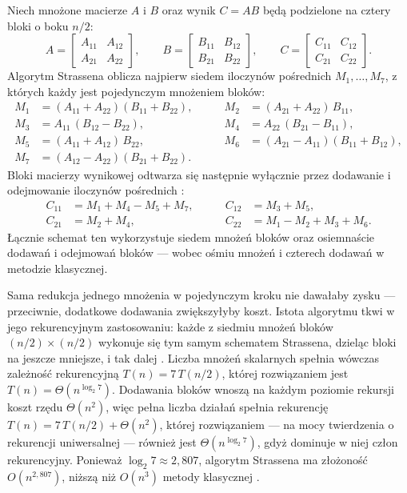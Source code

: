 \documentclass[a4paper,12pt]{book} %
\begin{document}
Niech mnożone macierze $A$ i $B$ oraz wynik $C = AB$ będą podzielone na cztery bloki o boku $n/2$:
\[
  A = \begin{bmatrix} A_{11} & A_{12} \\ A_{21} & A_{22} \end{bmatrix}, \qquad
  B = \begin{bmatrix} B_{11} & B_{12} \\ B_{21} & B_{22} \end{bmatrix}, \qquad
  C = \begin{bmatrix} C_{11} & C_{12} \\ C_{21} & C_{22} \end{bmatrix}.
\]
Algorytm Strassena oblicza najpierw siedem iloczynów pośrednich $M_1, \dots, M_7$, z których każdy jest pojedynczym mnożeniem bloków:
\[
  \begin{aligned}
    M_1 &= (A_{11} + A_{22})(B_{11} + B_{22}), &\qquad M_2 &= (A_{21} + A_{22})\,B_{11}, \\
    M_3 &= A_{11}\,(B_{12} - B_{22}),           &\qquad M_4 &= A_{22}\,(B_{21} - B_{11}), \\
    M_5 &= (A_{11} + A_{12})\,B_{22},           &\qquad M_6 &= (A_{21} - A_{11})(B_{11} + B_{12}), \\
    M_7 &= (A_{12} - A_{22})(B_{21} + B_{22}). &&
  \end{aligned}
\]
Bloki macierzy wynikowej odtwarza się następnie wyłącznie przez dodawanie i odejmowanie iloczynów pośrednich \cite{strassen1969gaussian}:
\[
  \begin{aligned}
    C_{11} &= M_1 + M_4 - M_5 + M_7, &\qquad C_{12} &= M_3 + M_5, \\
    C_{21} &= M_2 + M_4,             &\qquad C_{22} &= M_1 - M_2 + M_3 + M_6.
  \end{aligned}
\]
Łącznie schemat ten wykorzystuje siedem mnożeń bloków oraz osiemnaście dodawań i odejmowań bloków --- wobec ośmiu mnożeń i czterech dodawań w metodzie klasycznej.

Sama redukcja jednego mnożenia w pojedynczym kroku nie dawałaby zysku --- przeciwnie, dodatkowe dodawania zwiększyłyby koszt. Istota algorytmu tkwi w jego rekurencyjnym zastosowaniu: każde z siedmiu mnożeń bloków $(n/2) \times (n/2)$ wykonuje się tym samym schematem Strassena, dzieląc bloki na jeszcze mniejsze, i tak dalej \cite{strassen1969gaussian}. Liczba mnożeń skalarnych spełnia wówczas zależność rekurencyjną $T(n) = 7\,T(n/2)$, której rozwiązaniem jest $T(n) = \Theta\!\left(n^{\log_2 7}\right)$. Dodawania bloków wnoszą na każdym poziomie rekursji koszt rzędu $\Theta(n^2)$, więc pełna liczba działań spełnia rekurencję $T(n) = 7\,T(n/2) + \Theta(n^2)$, której rozwiązaniem --- na mocy twierdzenia o rekurencji uniwersalnej --- również jest $\Theta\!\left(n^{\log_2 7}\right)$, gdyż dominuje w niej człon rekurencyjny. Ponieważ $\log_2 7 \approx 2{,}807$, algorytm Strassena ma złożoność $O\!\left(n^{2{,}807}\right)$, niższą niż $O\!\left(n^3\right)$ metody klasycznej \cite{strassen1969gaussian,higham1990exploiting}.
\end{document}
